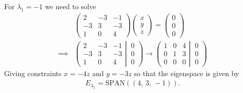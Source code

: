 {\noindent For $\lambda_1=-1$ we need to solve
\begin{align*}
& \begin{pmatrix}
  2 & -3 & -1 \\
 -3 &  3 & -3 \\
  1 &  0 &  4
\end{pmatrix}
\begin{pmatrix} x \\ y \\ z \end{pmatrix}
= 
\begin{pmatrix}
  0 \\
  0  \\
  0 
\end{pmatrix}
\\
\implies &
\left(
	\begin{matrix}
  2 & -3 & -1 \\
 -3 &  3 & -3 \\
  1 &  0 &  4
	\end{matrix}
  \left| \, 
	\begin{matrix}
  0 \\
  0 \\
  0 
	\end{matrix}
  \right.
\right)
\to
\left(
	\begin{matrix}
  1 &  0 &  4 \\
  0 &  1 &  3 \\
  0 &  0 &  0
	\end{matrix}
  \left| \, 
	\begin{matrix}
	  0 \\
	  0 \\
	  0 
    \end{matrix}
  \right.
\right)
\end{align*}
Giving constraints $x=-4z$ and $y=-3z$ so that the eigenspace is given by
\begin{align*}
E_{\lambda_1} = \text{SPAN}((4,\,3,\,-1)).
\end{align*}

}
